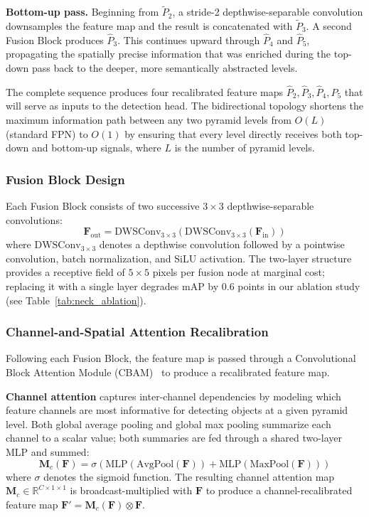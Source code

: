 \textbf{Bottom-up pass.}  Beginning from $\tilde{P}_2$, a
stride-2 depthwise-separable convolution downsamples the
feature map and the result is concatenated with $\tilde{P}_3$.
A second Fusion Block produces $\hat{P}_3$.  This continues
upward through $\hat{P}_4$ and $\hat{P}_5$, propagating the
spatially precise information that was enriched during the
top-down pass back to the deeper, more semantically abstracted
levels.

The complete sequence produces four recalibrated feature maps
$\hat{P}_2, \hat{P}_3, \hat{P}_4, \hat{P}_5$ that will serve
as inputs to the detection head.  The bidirectional topology
shortens the maximum information path between any two pyramid
levels from $O(L)$ (standard FPN) to $O(1)$ by ensuring that
every level directly receives both top-down and bottom-up
signals, where $L$ is the number of pyramid levels.

\subsubsection{Fusion Block Design}

Each Fusion Block consists of two successive $3 \times 3$
depthwise-separable convolutions:
\begin{equation}
    \mathbf{F}_{\text{out}} =
    \text{DWSConv}_{3\times3}\!\left(
        \text{DWSConv}_{3\times3}(\mathbf{F}_{\text{in}})
    \right)
    \label{eq:fblock}
\end{equation}
where $\text{DWSConv}_{3\times3}$ denotes a depthwise
convolution followed by a pointwise convolution, batch
normalization, and SiLU activation.  The two-layer structure
provides a receptive field of $5 \times 5$ pixels per fusion
node at marginal cost; replacing it with a single layer
degrades mAP by $0.6$ points in our ablation study (see
Table~\ref{tab:neck_ablation}).

\subsubsection{Channel-and-Spatial Attention Recalibration}

Following each Fusion Block, the feature map is passed through
a Convolutional Block Attention Module (CBAM)~\cite{woo2018cbam}
to produce a recalibrated feature map.

\textbf{Channel attention} captures inter-channel dependencies
by modeling which feature channels are most informative for
detecting objects at a given pyramid level.  Both global
average pooling and global max pooling summarize each channel
to a scalar value; both summaries are fed through a shared
two-layer MLP and summed:
\begin{equation}
    \mathbf{M}_c(\mathbf{F}) =
    \sigma\!\left(
        \text{MLP}\!\left(\text{AvgPool}(\mathbf{F})\right)
        + \text{MLP}\!\left(\text{MaxPool}(\mathbf{F})\right)
    \right)
    \label{eq:channel_att}
\end{equation}
where $\sigma$ denotes the sigmoid function.  The resulting
channel attention map $\mathbf{M}_c \in \mathbb{R}^{C \times
1 \times 1}$ is broadcast-multiplied with $\mathbf{F}$ to
produce a channel-recalibrated feature map
$\mathbf{F}' = \mathbf{M}_c(\mathbf{F}) \otimes \mathbf{F}$.

